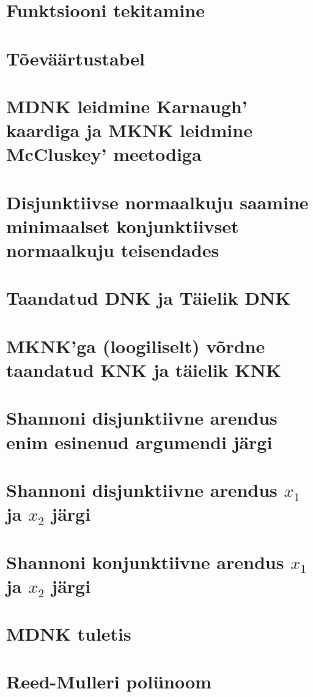 \documentclass[12pt]{article}
\begin{document}

\section{Funktsiooni tekitamine}

\section{Tõeväärtustabel}

\section{MDNK leidmine Karnaugh' kaardiga ja MKNK leidmine McCluskey' meetodiga}

\section{Disjunktiivse normaalkuju saamine minimaalset konjunktiivset normaalkuju teisendades}

\section{Taandatud DNK ja Täielik DNK}

\section{MKNK'ga (loogiliselt) võrdne taandatud KNK ja täielik KNK}

\section{Shannoni disjunktiivne arendus enim esinenud argumendi järgi}

\section{Shannoni disjunktiivne arendus $x_1$ ja $x_2$ järgi}

\section{Shannoni konjunktiivne arendus $x_1$ ja $x_2$ järgi}

\section{MDNK tuletis}

\section{Reed-Mulleri polünoom}

\end{document}
